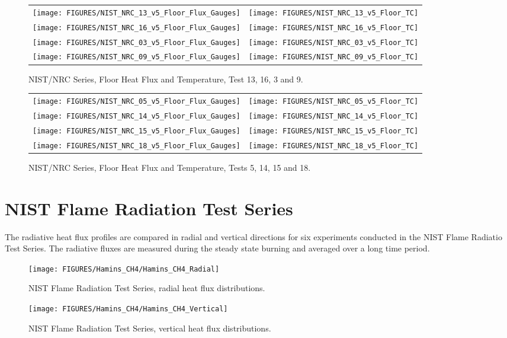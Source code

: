\begin{figure}[p]
\begin{tabular*}{\textwidth}{l@{\extracolsep{\fill}}r}
\texttt{[image: FIGURES/NIST\_NRC\_13\_v5\_Floor\_Flux\_Gauges]} &
\texttt{[image: FIGURES/NIST\_NRC\_13\_v5\_Floor\_TC]} \\
\texttt{[image: FIGURES/NIST\_NRC\_16\_v5\_Floor\_Flux\_Gauges]} &
\texttt{[image: FIGURES/NIST\_NRC\_16\_v5\_Floor\_TC]} \\
\texttt{[image: FIGURES/NIST\_NRC\_03\_v5\_Floor\_Flux\_Gauges]} &
\texttt{[image: FIGURES/NIST\_NRC\_03\_v5\_Floor\_TC]} \\
\texttt{[image: FIGURES/NIST\_NRC\_09\_v5\_Floor\_Flux\_Gauges]} &
\texttt{[image: FIGURES/NIST\_NRC\_09\_v5\_Floor\_TC]}

\end{tabular*}
\caption{NIST/NRC Series, Floor Heat Flux and Temperature, Test 13, 16, 3 and 9.}
\label{NIST_NRC_Floor_3}
\end{figure}

\begin{figure}[p]
\begin{tabular*}{\textwidth}{l@{\extracolsep{\fill}}r}
\texttt{[image: FIGURES/NIST\_NRC\_05\_v5\_Floor\_Flux\_Gauges]} &
\texttt{[image: FIGURES/NIST\_NRC\_05\_v5\_Floor\_TC]} \\
\texttt{[image: FIGURES/NIST\_NRC\_14\_v5\_Floor\_Flux\_Gauges]} &
\texttt{[image: FIGURES/NIST\_NRC\_14\_v5\_Floor\_TC]} \\
\texttt{[image: FIGURES/NIST\_NRC\_15\_v5\_Floor\_Flux\_Gauges]} &
\texttt{[image: FIGURES/NIST\_NRC\_15\_v5\_Floor\_TC]} \\
\texttt{[image: FIGURES/NIST\_NRC\_18\_v5\_Floor\_Flux\_Gauges]} &
\texttt{[image: FIGURES/NIST\_NRC\_18\_v5\_Floor\_TC]}
\end{tabular*}
\caption{NIST/NRC Series, Floor Heat Flux and Temperature, Tests 5, 14, 15 and 18.}
\label{NIST_NRC_Floor_4}
\end{figure}

\section{NIST Flame Radiation Test Series}

The radiative heat flux profiles are compared in radial and vertical
directions for six experiments conducted in the NIST Flame Radiatio
Test Series. The radiative fluxes are measured during the steady state
burning and averaged over a long time period.
\begin{figure}[p]
\begin{center}
\texttt{[image: FIGURES/Hamins\_CH4/Hamins\_CH4\_Radial]}
\caption{NIST Flame Radiation Test Series, radial heat flux distributions.}
\label{Hamins_CH4_Radial}
\end{center}
\end{figure}
\begin{figure}[p]
\begin{center}
\texttt{[image: FIGURES/Hamins\_CH4/Hamins\_CH4\_Vertical]}
\caption{NIST Flame Radiation Test Series, vertical heat flux distributions.}
\label{Hamins_CH4_Vertical}
\end{center}
\end{figure}


\clearpage

